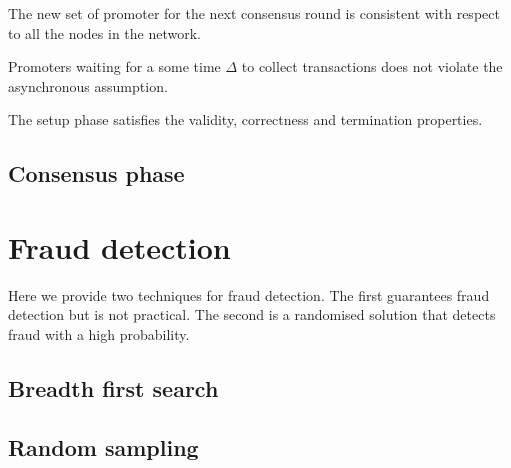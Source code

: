 \begin{lemma}
  The new set of promoter for the next consensus round is consistent with
  respect to all the nodes in the network.
\end{lemma}

\begin{lemma}
  Promoters waiting for a some time $\Delta$ to collect transactions does not
  violate the asynchronous assumption.
\end{lemma}

\begin{corollary}
  The setup phase satisfies the validity, correctness and termination
  properties.
\end{corollary}

\subsection{Consensus phase}


\section{Fraud detection}
Here we provide two techniques for fraud detection. The first guarantees fraud
detection but is not practical. The second is a randomised solution that detects
fraud with a high probability.

\subsection{Breadth first search}

\subsection{Random sampling}

